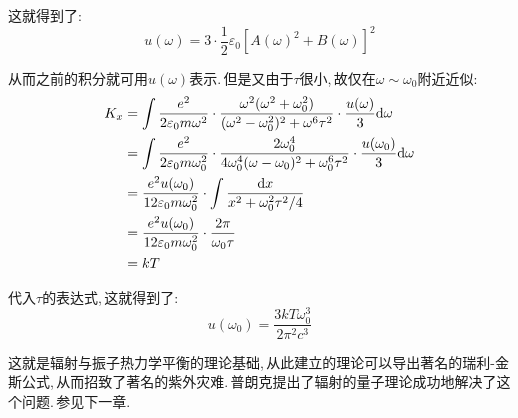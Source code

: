 这就得到了:
\[u(\omega)=3\cdot \frac{1}{2}\varepsilon_0 [A(\omega)^2+B(\omega)]^2\]

从而之前的积分就可用$u(\omega)$表示.\,但是又由于$\tau$很小,\,故仅在$\omega\sim \omega_0$附近近似:
\begin{align*}
K_x 	&=\int \frac{e^2}{2\varepsilon_0 m\omega^2}\cdot \frac{\omega^2(\omega^2+\omega_0^2)}{(\omega^2-\omega_0^2)^2+\omega^6\tau^2}\cdot \frac{u(\omega)}{3} \textrm{d} \omega\\
		&=\int \frac{e^2}{2\varepsilon_0 m\omega_0^2}\cdot \frac{2\omega_0^4}{4\omega_0^4(\omega-\omega_0)^2+\omega_0^6\tau^2}\cdot \frac{u(\omega_0)}{3} \textrm{d} \omega\\
		&=\frac{e^2u(\omega_0)}{12\varepsilon_0 m\omega_0^2}\cdot\int \frac{\textrm{d} x}{x^2+\omega_0^2\tau^2/4}\\
		&=\frac{e^2u(\omega_0)}{12\varepsilon_0 m\omega_0^2}\cdot\frac{2\pi}{\omega_0\tau}\\
		&=kT
\end{align*}

代入$\tau$的表达式,\,这就得到了:
\[u(\omega_0)=\frac{3kT\omega_0^3}{2\pi^2c^3}\]

这就是辐射与振子热力学平衡的理论基础,\,从此建立的理论可以导出著名的瑞利-金斯公式,\,从而招致了著名的紫外灾难.\,普朗克提出了辐射的量子理论成功地解决了这个问题.\,参见下一章.













